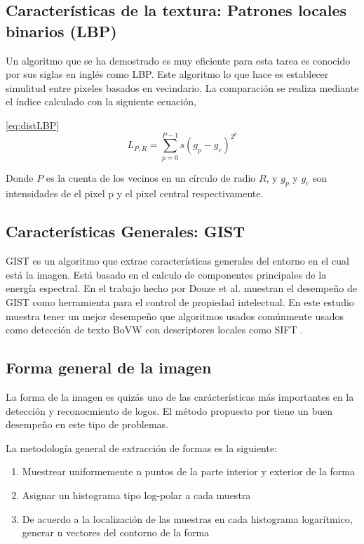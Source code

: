 \documentclass[conference]{IEEEtran}
\begin{document}
\subsection{Caracter\'isticas de la textura: Patrones locales binarios (LBP)}

Un algoritmo que se ha demostrado es muy eficiente para esta tarea es conocido por sus siglas en inglés como LBP\cite{LBP}. Este algoritmo lo que hace es establecer simulitud entre pixeles basados en vecindario. La comparación se realiza mediante el índice calculado con la siguiente ecuación,

\ref{eq:distLBP} 
	\begin{equation}
	L_{P,R} = \sum_{p=0}^{P-1} s{(g_p - g_c)}^{{2}^p}
	\label{eq:distLBP}
\end{equation}

Donde $P$ es la cuenta de los vecinos en un círculo de radio $R$, y $g_p$ y $g_c$ son intensidades de el pixel p y el pixel central respectivamente.

\subsection{Características Generales: GIST}
GIST es un algoritmo que extrae características generales del entorno en el cual está la imagen. Está basado en el calculo de componentes principales de la energía espectral. En el trabajo hecho por Douze et al. \cite{GIST} muestran el desempeño de GIST como herramienta para el control de propiedad intelectual. En este estudio muestra tener un mejor desempeño que algoritmos usados comúnmente usados como detección de texto BoVW \cite{bowd} con descriptores locales como SIFT \cite{kpoint}.



\subsection{Forma general de la imagen}

La forma de la imagen es quizás uno de las carácterísticas más importantes en la detección y reconocmiento de logos. El método propuesto por \cite{shape} tiene un buen desempeño en este tipo de problemas.

La metodología general de extracción de formas es la siguiente:

\begin{enumerate}
\item{Muestrear uniformemente n puntos de la parte interior y exterior de la forma}

\item{Asignar un histograma tipo log-polar a cada muestra}

\item{De acuerdo a la localización de las muestras en cada histograma logarítmico, generar n vectores del contorno de la forma}
\end{enumerate}
\end{document}
